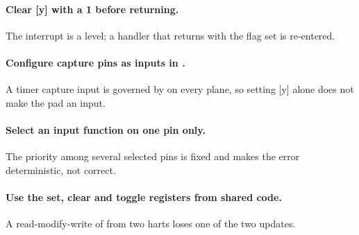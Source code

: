 \paragraph{Clear [y] with a 1 before returning.} The interrupt is a level; a handler that returns with the flag set is re-entered.

\paragraph{Configure capture pins as inputs in .} A timer capture input is governed by  on every plane, so setting [y] alone does not make the pad an input.

\paragraph{Select an input function on one pin only.} The priority among several selected pins is fixed and makes the error deterministic, not correct.

\paragraph{Use the set, clear and toggle registers from shared code.} A read-modify-write of  from two harts loses one of the two updates.
